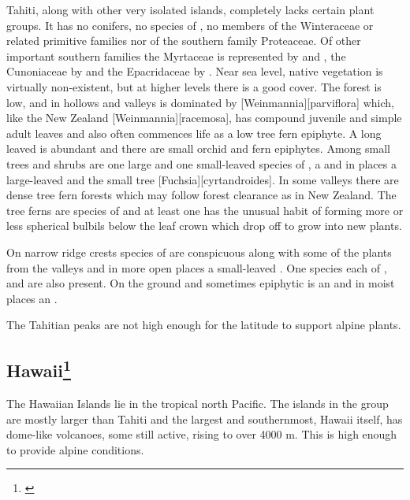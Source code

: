 Tahiti, along with other very isolated islands, completely lacks certain plant groups.
It has no conifers, no species of , no members of the Winteraceae or related primitive families nor of the southern family Proteaceae.
Of other important southern families the Myrtaceae is represented by  and , the Cunoniaceae by  and the Epacridaceae by .
Near sea level, native vegetation is virtually non-existent, but at higher levels there is a good cover.
The forest is low, and in hollows and valleys is dominated by [Weinmannia][parviflora] which, like the New Zealand [Weinmannia][racemosa], has compound juvenile and simple adult leaves and also often commences life as a low tree fern epiphyte.
A long leaved  is abundant and there are small orchid and fern epiphytes.
Among small trees and shrubs are one large and one small-leaved species of , a  and in places a large-leaved  and the small tree [Fuchsia][cyrtandroides].
In some valleys there are dense tree fern forests which may follow forest clearance as in New Zealand.
The tree ferns are species of  and at least one has the unusual habit of forming more or less spherical bulbils below the leaf crown which drop off to grow into new plants.

On narrow ridge crests species of  are conspicuous along with some of the plants from the valleys and in more open places a small-leaved .
One species each of ,  and  are also present.
On the ground and sometimes epiphytic is an  and in moist places an .

The Tahitian peaks are not high enough for the latitude to support alpine plants.

\subsection[Hawai{\okina}i]{Hawai{\okina}i\thinspace\footnote{\cite{carlquist1970hawaii}}}

The Hawaiian Islands lie in the tropical north Pacific.
The islands in the group are mostly larger than Tahiti and the largest and southernmost, Hawai{\okina}i itself, has dome-like volcanoes, some still active, rising to over 4000 m.
This is high enough to provide alpine conditions.

